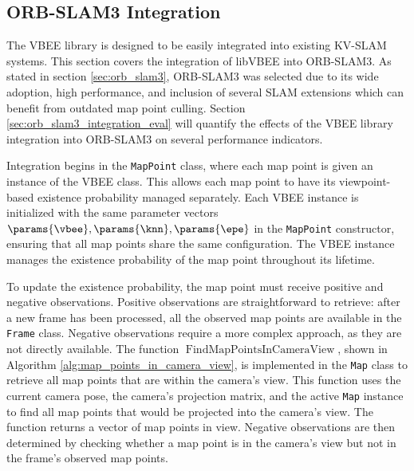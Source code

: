 \subsection{ORB-SLAM3 Integration}
\label{sec:orb_slam3_integration}

The VBEE library is designed to be easily integrated into existing KV-SLAM systems. This section covers the integration of libVBEE into ORB-SLAM3. As stated in section \ref{sec:orb_slam3}, ORB-SLAM3 was selected due to its wide adoption, high performance, and inclusion of several SLAM extensions which can benefit from outdated map point culling. Section \ref{sec:orb_slam3_integration_eval} will quantify the effects of the VBEE library integration into ORB-SLAM3 on several performance indicators.

Integration begins in the \texttt{MapPoint} class, where each map point is given an instance of the VBEE class. This allows each map point to have its viewpoint-based existence probability managed separately. Each VBEE instance is initialized with the same parameter vectors $\params{\vbee}, \params{\knn}, \params{\epe}$ in the \texttt{MapPoint} constructor, ensuring that all map points share the same configuration. The VBEE instance manages the existence probability of the map point throughout its lifetime.

To update the existence probability, the map point must receive positive and negative observations. Positive observations are straightforward to retrieve: after a new frame has been processed, all the observed map points are available in the \texttt{Frame} class. Negative observations require a more complex approach, as they are not directly available. The function $\operatorname{FindMapPointsInCameraView}$, shown in Algorithm \ref{alg:map_points_in_camera_view}, is implemented in the \texttt{Map} class to retrieve all map points that are within the camera's view. This function uses the current camera pose, the camera's projection matrix, and the active \texttt{Map} instance to find all map points that would be projected into the camera's view. The function returns a vector of map points in view. Negative observations are then determined by checking whether a map point is in the camera's view but not in the frame's observed map points.

